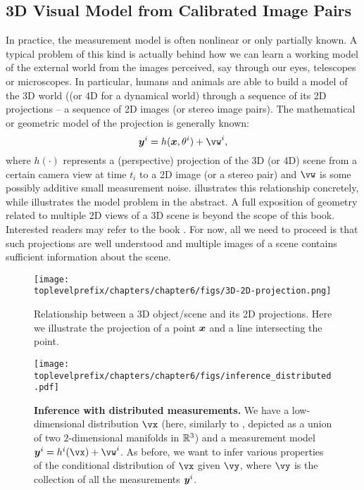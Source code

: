 \documentclass[../../book-main.tex]{subfiles}
\begin{document}
\subsection{3D Visual Model from Calibrated Image Pairs}
In practice, the measurement model is often nonlinear or only partially known. A typical problem of this kind is actually behind how we can learn a working model of the external world from the  images perceived, say through our eyes,  telescopes or microscopes. In particular, humans and animals are able to build a model of the 3D world ((or 4D for a dynamical world) through a sequence of its 2D projections -- a sequence of 2D images (or stereo image pairs). The mathematical or geometric model of the projection is generally known:
\begin{equation}
    \y^i = h(\x, \theta^i) +\vw^{i}, 
\end{equation}
where $h(\cdot)$ represents a  (perspective) projection of the 3D (or 4D) scene from a certain camera view at time $t_i$ to a 2D image (or a stereo pair) and $\vw$ is some possibly additive small measurement noise.  illustrates this relationship concretely, while  illustrates the model problem in the abstract. A full exposition of geometry related to multiple 2D views of a 3D scene is beyond the scope of this book. Interested readers may refer to the book \cite{MaY2003}. For now, all we need to proceed is that such projections are well understood and multiple images of a scene contains sufficient information about the scene.
\begin{figure}[t]
    \centering
    \texttt{[image: \\toplevelprefix/chapters/chapter6/figs/3D-2D-projection.png]}
    \caption{Relationship between a 3D object/scene and its 2D projections. Here we illustrate the projection of a point $\bm{x}$ and a line intersecting the point.}
    \label{fig:projection-2D}
\end{figure}

\begin{figure}[t]
  \centering 
  \texttt{[image: \\toplevelprefix/chapters/chapter6/figs/inference\_distributed.pdf]}
  \caption{\small \textbf{Inference with distributed measurements.} We have a low-dimensional distribution \(\vx\) (here, similarly to , depicted as a union of two \(2\)-dimensional manifolds in \(\mathbb{R}^{3}\)) and a measurement model \(\y^{i} = h^{i}(\vx) + \vw^{i}\). As before, we want to infer various properties of the conditional distribution of \(\vx\) given \(\vy\), where \(\vy\) is the collection of all the measurements \(\bm{y}^{i}\).}
  \label{fig:inference_distributed}
\end{figure}
\end{document}
